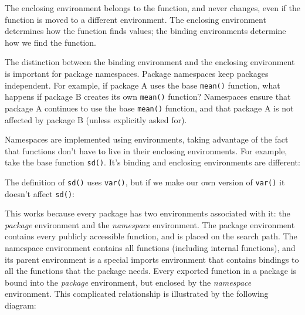 The enclosing environment belongs to the function, and never changes,
even if the function is moved to a different environment. The enclosing
environment determines how the function finds values; the binding
environments determine how we find the function.

The distinction between the binding environment and the enclosing
environment is important for package namespaces. Package namespaces keep
packages independent. For example, if package A uses the base
\texttt{mean()} function, what happens if package B creates its own
\texttt{mean()} function? Namespaces ensure that package A continues to
use the base \texttt{mean()} function, and that package A is not
affected by package B (unless explicitly asked for). 

Namespaces are implemented using environments, taking advantage of the
fact that functions don't have to live in their enclosing environments.
For example, take the base function \texttt{sd()}. It's binding and
enclosing environments are different:

\begin{Shaded}
\begin{Highlighting}[]
\NormalTok{(}\NormalTok{)}
\end{Highlighting}
\end{Shaded}

The definition of \texttt{sd()} uses \texttt{var()}, but if we make our
own version of \texttt{var()} it doesn't affect \texttt{sd()}:

\begin{Shaded}
\begin{Highlighting}[]
\StringTok{ }\NormalTok{:}
\StringTok{ } \NormalTok{) }
\end{Highlighting}
\end{Shaded}

This works because every package has two environments associated with
it: the \emph{package} environment and the \emph{namespace} environment.
The package environment contains every publicly accessible function, and
is placed on the search path. The namespace environment contains all
functions (including internal functions), and its parent environment is
a special imports environment that contains bindings to all the
functions that the package needs. Every exported function in a package
is bound into the \emph{package} environment, but enclosed by the
\emph{namespace} environment. This complicated relationship is
illustrated by the following diagram:

